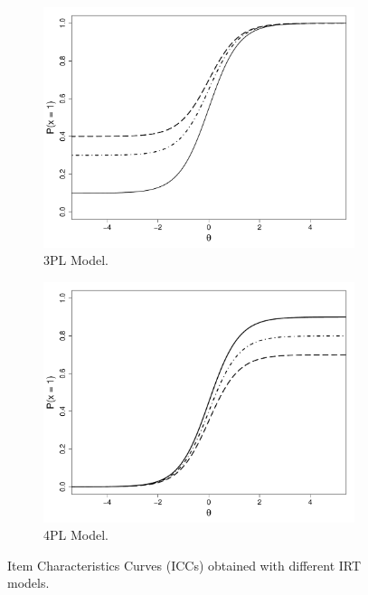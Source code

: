 \documentclass[12pt]{book}
\begin{document}
\begin{figure}[h!]
\begin{subfigure}{0.45\linewidth}
		\includegraphics[width=\linewidth]{ThreePL.pdf}
		\caption{3PL Model.}
		\label{subfig:3pl}
	\end{subfigure}
	\begin{subfigure}{0.45\linewidth}
		\includegraphics[width=\linewidth]{FourPL.pdf}
		\caption{4PL Model.}
		\label{subfig:4pl}
	\end{subfigure}
	\caption{\label{fig:IRTmodels} Item Characteristics Curves (ICCs) obtained with different IRT models.}
\end{figure}
\end{document}
